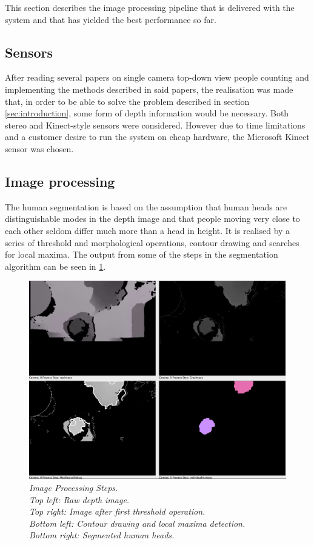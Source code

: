 This section describes the image processing pipeline that is delivered with the system and that has yielded the best performance so far.

\subsection{Sensors}
After reading several papers on single camera top-down view people counting and implementing the methods described in said papers, the realisation was made that, in order to be able to solve the problem described in section \ref{sec:introduction}, some form of depth information would be necessary. Both stereo and Kinect-style sensors were considered. However due to time limitations and a customer desire to run the system on cheap hardware, the Microsoft Kinect sensor was chosen.

\subsection{Image processing}
The human segmentation is based on the assumption that human heads are distinguishable modes in the depth image and that people moving very close to each other seldom differ much more than a head in height. It is realised by a series of threshold and morphological operations, contour drawing and searches for local maxima. The output from some of the steps in the segmentation algorithm can be seen in \ref{fig:image_processing_steps}.

\begin{figure}[htb]
	\centering
	\includegraphics[width=\linewidth]{images/image_processing_steps.png}
	\caption[Image Processing Steps]{\textit{Image Processing Steps.\\
		Top left: Raw depth image.\\ 
		Top right: Image after first threshold operation.\\ 
		Bottom left: Contour drawing and local maxima detection.\\ 
		Bottom right: Segmented human heads.}}
	\label{fig:image_processing_steps}  %
\end{figure}

